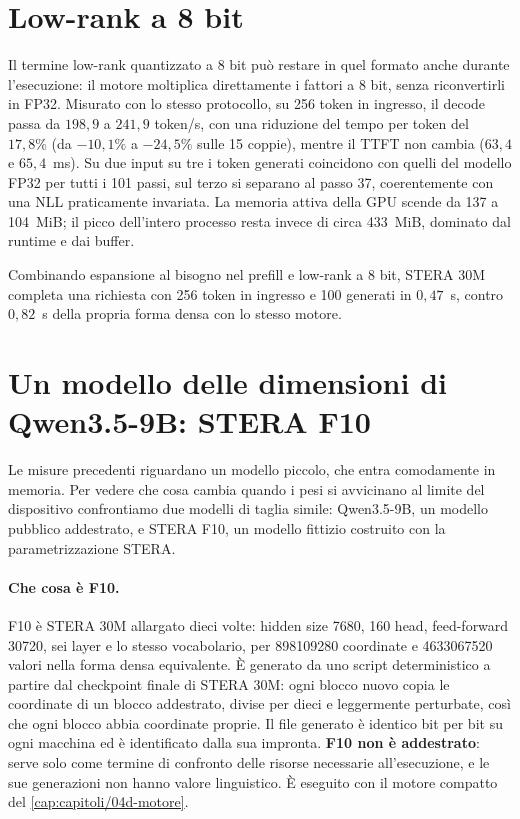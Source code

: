 \section{Low-rank a 8 bit}
\label{sec:rango8-tempi}

Il termine low-rank quantizzato a 8 bit può restare in quel formato anche durante l'esecuzione: il motore moltiplica direttamente i fattori a 8 bit, senza riconvertirli in FP32. Misurato con lo stesso protocollo, su 256 token in ingresso, il decode passa da $198{,}9$ a $241{,}9$ token/s, con una riduzione del tempo per token del $17{,}8\%$ (da $-10{,}1\%$ a $-24{,}5\%$ sulle 15 coppie), mentre il TTFT non cambia ($63{,}4$ e $65{,}4$~ms). Su due input su tre i token generati coincidono con quelli del modello FP32 per tutti i 101 passi, sul terzo si separano al passo 37, coerentemente con una NLL praticamente invariata. La memoria attiva della GPU scende da 137 a 104~MiB; il picco dell'intero processo resta invece di circa 433~MiB, dominato dal runtime e dai buffer.

Combinando espansione al bisogno nel prefill e low-rank a 8 bit, STERA 30M completa una richiesta con 256 token in ingresso e 100 generati in $0{,}47$~s, contro $0{,}82$~s della propria forma densa con lo stesso motore.

\section{Un modello delle dimensioni di Qwen3.5-9B: STERA F10}
\label{sec:qwen-f10-ssd}

Le misure precedenti riguardano un modello piccolo, che entra comodamente in memoria. Per vedere che cosa cambia quando i pesi si avvicinano al limite del dispositivo confrontiamo due modelli di taglia simile: Qwen3.5-9B, un modello pubblico addestrato, e STERA F10, un modello fittizio costruito con la parametrizzazione STERA.

\paragraph{Che cosa è F10.} F10 è STERA 30M allargato dieci volte: hidden size \num{7680}, 160 head, feed-forward \num{30720}, sei layer e lo stesso vocabolario, per \num{898109280} coordinate e \num{4633067520} valori nella forma densa equivalente. È generato da uno script deterministico a partire dal checkpoint finale di STERA 30M: ogni blocco nuovo copia le coordinate di un blocco addestrato, divise per dieci e leggermente perturbate, così che ogni blocco abbia coordinate proprie. Il file generato è identico bit per bit su ogni macchina ed è identificato dalla sua impronta. \textbf{F10 non è addestrato}: serve solo come termine di confronto delle risorse necessarie all'esecuzione, e le sue generazioni non hanno valore linguistico. È eseguito con il motore compatto del \autoref{cap:capitoli/04d-motore}.

